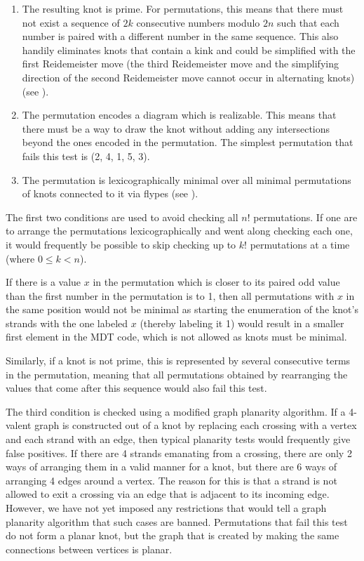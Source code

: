 \begin{paper}
\begin{enumerate}
\item The resulting knot is prime.
For permutations, this means that there must not exist a sequence of $2k$
consecutive numbers modulo $2n$ such that each number is paired with a different
number in the same sequence.
This also handily eliminates knots that contain a kink and could be simplified
with the first Reidemeister move (the third Reidemeister move and the
simplifying direction of the second Reidemeister move cannot occur in
alternating knots) (see \figMoves).
\item The permutation encodes a diagram which is realizable.
This means that there must be a way to draw the knot without adding any
intersections beyond the ones encoded in the permutation.
The simplest permutation that fails this test is (2, 4, 1, 5, 3).
\item The permutation is lexicographically minimal over all minimal
permutations of knots connected to it via flypes (see \figMoves).
\end{enumerate}


The first two conditions are used to avoid checking all $n!$ permutations.
If one are to arrange the permutations lexicographically and went along
checking each one, it would frequently be possible to skip checking up to $k!$
permutations at a time (where $0\leq k<n$).

If there is a value $x$ in the permutation which is closer to its paired odd
value than the first number in the permutation is to 1, then all permutations
with $x$ in the same position would not be minimal as starting the enumeration
of the knot's strands with the one labeled $x$ (thereby labeling it 1) would
result in a smaller first element in the MDT code, which is not allowed as knots
must be minimal.


Similarly, if a knot is not prime, this is represented by several consecutive
terms in the permutation, meaning that all permutations obtained by rearranging
the values that come after this sequence would also fail this test.

The third condition is checked using a modified graph planarity algorithm.
If a 4-valent graph is constructed out of a knot by replacing each crossing with
a vertex and each strand with an edge, then typical planarity tests would
frequently give false positives.
If there are 4 strands emanating from a crossing, there are only 2 ways of
arranging them in a valid manner for a knot, but there are 6 ways of arranging
4 edges around a vertex.
The reason for this is that a strand is not allowed to exit a crossing via an
edge that is adjacent to its incoming edge.
However, we have not yet imposed any restrictions that would tell a graph
planarity algorithm that such cases are banned.
Permutations that fail this test do not form a planar knot, but the graph that
is created by making the same connections between vertices is planar.\\


\end{paper}
